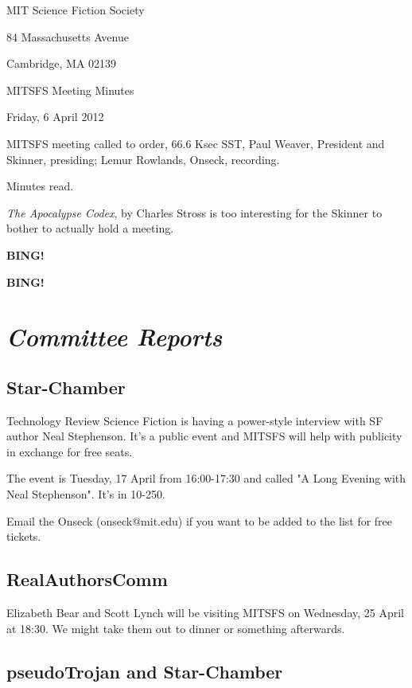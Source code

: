 \documentclass[10pt]{article}
\newcommand{\bing}{{\bf BING!} }
\newcommand{\goto}[1]{\bing \vskip 12pt \section*{{\em{#1}}}}
\newcommand{\skinner}{Paul Weaver, President and Skinner}
\newcommand{\onseck}{Lemur Rowlands, Onseck}
\newcommand{\meetingdate}{Friday, 6 April 2012}
\begin{document}
\begin{center}

MIT Science Fiction Society

84 Massachusetts Avenue

Cambridge, MA 02139

\vspace{12pt}

MITSFS Meeting Minutes

\meetingdate

\end{center}

\vspace{18pt}

\setlength{\parskip}{6pt}

\noindent
MITSFS meeting called to order, 66.6 Ksec SST,
\skinner, presiding; \onseck, recording.

Minutes read.

\emph{The Apocalypse Codex}, by Charles Stross is too interesting
for the Skinner to bother to actually hold a meeting.

\bing

\goto{Committee Reports}

\subsection*{Star-Chamber}

Technology Review Science Fiction is having a power-style interview 
with SF author Neal Stephenson. It's a public event and MITSFS will 
help with publicity in exchange for free seats.

The event is Tuesday, 17 April from 16:00-17:30 and called 
"A Long Evening with Neal Stephenson". It's in 10-250. 

Email the Onseck (onseck@mit.edu) if you want to be added to the list
for free tickets.


\subsection*{RealAuthorsComm}

Elizabeth Bear and Scott Lynch will be visiting MITSFS on Wednesday,
25 April at 18:30.  We might take them out to dinner or something
afterwards.


\subsection*{pseudoTrojan and Star-Chamber}
\end{document}
